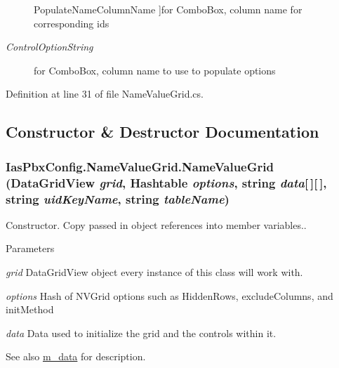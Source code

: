 \begin{Desc}
\begin{description}
{\hypertarget{class_ias_pbx_config_1_1_name_value_grid_ad252779c8bb45743ebf71025b284957e}{
PopulateNameColumnName}
\label{class_ias_pbx_config_1_1_name_value_grid_ad252779c8bb45743ebf71025b284957e}
}]for ComboBox, column name for corresponding ids \item[{\em 
\hypertarget{class_ias_pbx_config_1_1_name_value_grid_ad252779c8bb45743ebf71025b284957e}{
ControlOptionString}
\label{class_ias_pbx_config_1_1_name_value_grid_ad252779c8bb45743ebf71025b284957e}
}]for ComboBox, column name to use to populate options \end{description}
\end{Desc}



Definition at line 31 of file NameValueGrid.cs.

\subsection{Constructor \& Destructor Documentation}
\hypertarget{class_ias_pbx_config_1_1_name_value_grid_af47450cb245bcef5cfb1744191c3e371}{
\subsubsection[{NameValueGrid}]{\setlength{\rightskip}{0pt plus 5cm}IasPbxConfig.NameValueGrid.NameValueGrid (DataGridView {\em grid}, \/  Hashtable {\em options}, \/  string {\em data}\mbox{[}$\,$\mbox{]}\mbox{[}$\,$\mbox{]}, \/  string {\em uidKeyName}, \/  string {\em tableName})}}
\label{class_ias_pbx_config_1_1_name_value_grid_af47450cb245bcef5cfb1744191c3e371}


Constructor. Copy passed in object references into member variables.. 
\begin{DoxyParams}{Parameters}
\item[{\em grid}]DataGridView object every instance of this class will work with. \item[{\em options}]Hash of NVGrid options such as HiddenRows, excludeColumns, and initMethod \item[{\em data}]Data used to initialize the grid and the controls within it. \end{DoxyParams}
\begin{DoxySeeAlso}{See also}
\hyperlink{class_ias_pbx_config_1_1_name_value_grid_a816a0c9ece3edb83afb39863e1f843b4}{m\_\-data} for description. 
\end{DoxySeeAlso}

